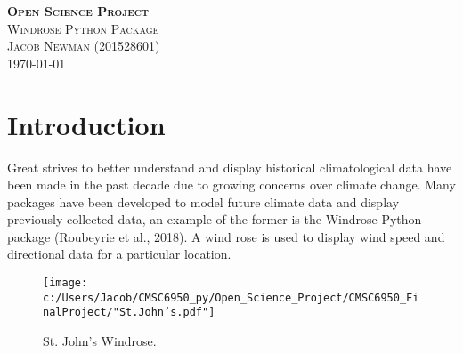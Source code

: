 \documentclass{article}
\begin{document}
\begin{titlepage}
\newcommand{\HRule}{\rule{\linewidth}{0.5mm}}

\center
\textsc{\LARGE \textbf{Open Science Project}}\\[1 cm]

\textsc{\Large Windrose Python Package}\\[0.5 cm]

\textsc{\large Jacob Newman (201528601)}\\[0.5 cm]





\vfill\vfill\vfill
{\large\today}
\vfill

\end{titlepage}


\section{Introduction}\label{Introduction}
Great strives to better understand and display historical climatological data have been made in the past decade due to growing concerns over climate change. Many packages have been developed to model 
future climate data and display previously collected data, an example of the former is the Windrose Python package (Roubeyrie et al., 2018). A wind rose is used to display wind speed and directional data 
for a particular location.  

\begin{figure}[h!]
\texttt{[image: c:/Users/Jacob/CMSC6950\_py/Open\_Science\_Project/CMSC6950\_FinalProject/"St.John's.pdf"]}
\label{St._John's_Windrose}
\caption{St. John's Windrose.}
\end{figure}
\end{document}
